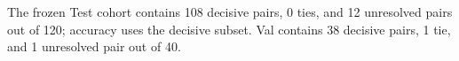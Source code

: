 The frozen Test cohort contains 108 decisive pairs, 0 ties, and 12 unresolved pairs out of 120; accuracy uses the decisive subset.
Val contains 38 decisive pairs, 1 tie, and 1 unresolved pair out of 40.